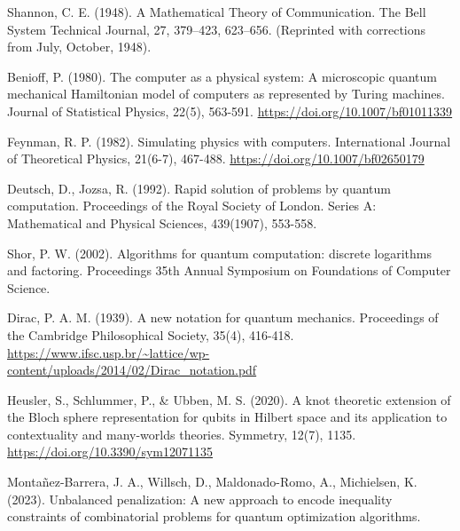 \begin{thebibliography}{a}


Shannon, C. E. (1948). A Mathematical Theory of Communication. The Bell System Technical Journal, 27, 379–423, 623–656. (Reprinted with corrections from July, October, 1948).


Benioff, P. (1980). The computer as a physical system: A microscopic quantum mechanical Hamiltonian model of computers as represented by Turing machines. Journal of Statistical Physics, 22(5), 563-591. \url{https://doi.org/10.1007/bf01011339}


Feynman, R. P. (1982). Simulating physics with computers. International Journal of Theoretical Physics, 21(6-7), 467-488. \url{https://doi.org/10.1007/bf02650179}


Deutsch, D., Jozsa, R. (1992). Rapid solution of problems by quantum computation. Proceedings of the Royal Society of London. Series A: Mathematical and Physical Sciences, 439(1907), 553-558.



Shor, P. W. (2002). Algorithms for quantum computation: discrete logarithms and factoring. Proceedings 35th Annual Symposium on Foundations of Computer Science.


Dirac, P. A. M. (1939). A new notation for quantum mechanics. Proceedings of the Cambridge Philosophical Society, 35(4), 416-418. \url{https://www.ifsc.usp.br/~lattice/wp-content/uploads/2014/02/Dirac_notation.pdf}


Heusler, S., Schlummer, P., \& Ubben, M. S. (2020). A knot theoretic extension of the Bloch sphere representation for qubits in Hilbert space and its application to contextuality and many-worlds theories. Symmetry, 12(7), 1135. \url{https://doi.org/10.3390/sym12071135}


Montañez-Barrera, J. A., Willsch, D., Maldonado-Romo, A., Michielsen, K. (2023). Unbalanced penalization: A new approach to encode inequality constraints of combinatorial problems for quantum optimization algorithms.


\end{thebibliography}
